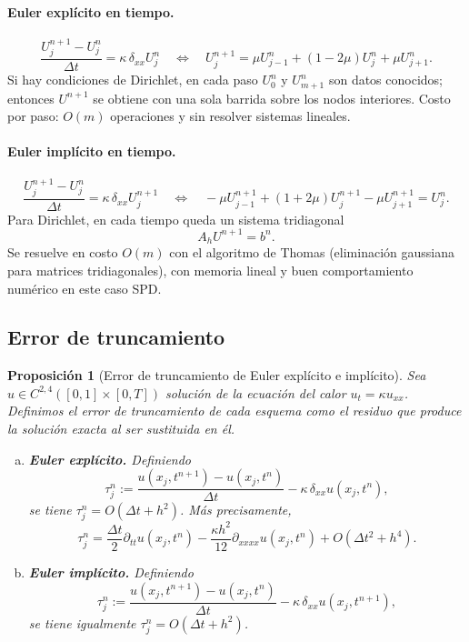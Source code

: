 \documentclass[a4paper,11pt]{report}
\newtheorem{proposition}[theorem]{Proposición}
\begin{document}
\paragraph{Euler explícito en tiempo.}
\[
  \frac{U_j^{n+1}-U_j^n}{\Delta t}=\kappa\,\delta_{xx}U_j^n
  \quad\Longleftrightarrow\quad
  U_j^{n+1}=\mu U_{j-1}^n+(1-2\mu)U_j^n+\mu U_{j+1}^n.
\]
Si hay condiciones de Dirichlet, en cada paso $U_0^n$ y $U_{m+1}^n$ son datos conocidos; entonces $U^{n+1}$ se obtiene con una sola barrida sobre los nodos interiores. Costo por paso: $O(m)$ operaciones y sin resolver sistemas lineales.

\paragraph{Euler implícito en tiempo.}
\[
  \frac{U_j^{n+1}-U_j^n}{\Delta t}=\kappa\,\delta_{xx}U_j^{n+1}
  \quad\Longleftrightarrow\quad
  -\mu U_{j-1}^{n+1}+(1+2\mu)U_j^{n+1}-\mu U_{j+1}^{n+1}=U_j^n.
\]
Para Dirichlet, en cada tiempo queda un sistema tridiagonal
\[
  A_h U^{n+1}=b^n.
\]
Se resuelve en costo $O(m)$ con el algoritmo de Thomas (eliminación gaussiana para matrices tridiagonales), con memoria lineal y buen comportamiento numérico en este caso SPD.

\subsection{Error de truncamiento}

\begin{proposition}[Error de truncamiento de Euler explícito e implícito]\label{prop:lte_euler_pde}
Sea $u\in C^{2,4}([0,1]\times[0,T])$ solución de la ecuación del calor $u_t=\kappa u_{xx}$. Definimos el error de truncamiento de cada esquema como el residuo que produce la solución exacta al ser sustituida en él.
\begin{enumerate}[(a)]
\item \textbf{Euler explícito.} Definiendo
\[
  \tau_j^n := \frac{u(x_j,t^{n+1})-u(x_j,t^n)}{\Delta t} - \kappa\,\delta_{xx}u(x_j,t^n),
\]
se tiene $\tau_j^n = O(\Delta t + h^2)$.  Más precisamente,
\[
  \tau_j^n = \frac{\Delta t}{2}\partial_{tt}u(x_j,t^n)
             - \frac{\kappa h^2}{12}\partial_{xxxx}u(x_j,t^n) + O(\Delta t^2+h^4).
\]
\item \textbf{Euler implícito.} Definiendo
\[
  \tau_j^n := \frac{u(x_j,t^{n+1})-u(x_j,t^n)}{\Delta t} - \kappa\,\delta_{xx}u(x_j,t^{n+1}),
\]
se tiene igualmente $\tau_j^n = O(\Delta t + h^2)$.
\end{enumerate}
\end{proposition}
\end{document}
